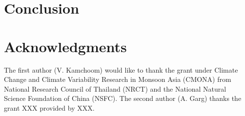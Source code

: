 \documentclass[12pt,a4paper]{article}
\begin{document}
	
	
	\section{Conclusion}
	
	\section*{Acknowledgments}
	
	The first author (V. Kamchoom) would like to thank the grant under Climate Change and Climate Variability Research in Monsoon Asia (CMONA) from National Research Council of Thailand (NRCT) and the National Natural Science Foundation of China (NSFC). The second author (A. Garg) thanks the grant XXX provided by XXX. 
	
	
	
	
\end{document}
